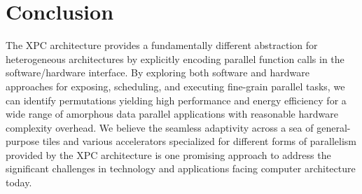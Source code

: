 
\section{Conclusion}
\label{sec-conclusion}

The XPC architecture provides a fundamentally different abstraction for
heterogeneous architectures by explicitly encoding parallel function
calls in the software/hardware interface. By exploring both software and
hardware approaches for exposing, scheduling, and executing fine-grain
parallel tasks, we can identify permutations yielding high performance
and energy efficiency for a wide range of amorphous data parallel
applications with reasonable hardware complexity overhead. We believe the
seamless adaptivity across a sea of general-purpose tiles and various
accelerators specialized for different forms of parallelism provided by
the XPC architecture is one promising approach to address the significant
challenges in technology and applications facing computer architecture
today.

